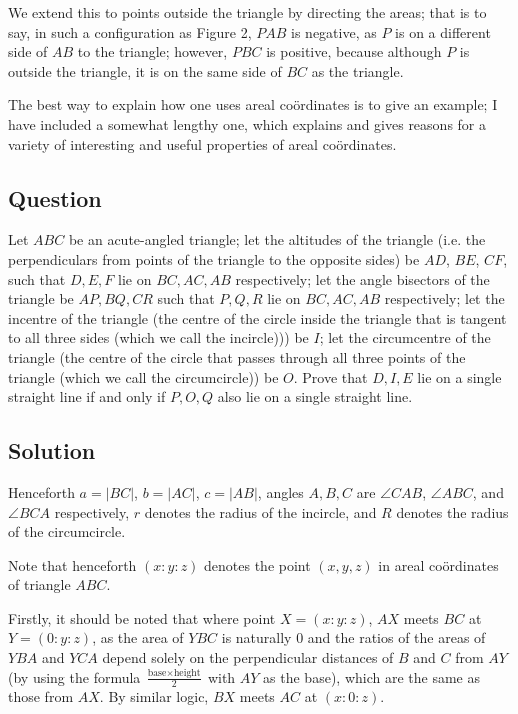 We extend this to points outside the triangle by directing the areas; that is to say, in such a configuration as Figure 2, \(PAB\) is negative, as \(P\) is on a different side of \(AB\) to the triangle; however, \(PBC\) is positive, because although \(P\) is outside the triangle, it is on the same side of \(BC\) as the triangle.

The best way to explain how one uses areal coördinates is to give an example; I have included a somewhat lengthy one, which explains and gives reasons for a variety of interesting and useful properties of areal coördinates.

\subsection{Question}

Let \(ABC\) be an acute-angled triangle; let the altitudes of the triangle (i.e. the perpendiculars from points of the triangle to the opposite sides) be \(AD\), \(BE\), \(CF\), such that \(D, E, F\) lie on \(BC, AC, AB\) respectively; let the angle bisectors of the triangle be \(AP, BQ, CR\) such that \(P, Q, R\) lie on \(BC, AC, AB\) respectively; let the incentre of the triangle (the centre of the circle inside the triangle that is tangent to all three sides (which we call the incircle))) be \(I\); let the circumcentre of the triangle (the centre of the circle that passes through all three points of the triangle (which we call the circumcircle)) be \(O\). Prove that \(D, I, E\) lie on a single straight line if and only if \(P, O, Q\) also lie on a single straight line.

\subsection{Solution}

Henceforth \(a=|BC|\), \(b=|AC|\), \(c=|AB|\), angles \(A,B,C\) are \(\angle{}CAB\), \(\angle{}ABC\), and \(\angle{}BCA\) respectively, \(r\) denotes the radius of the incircle, and \(R\) denotes the radius of the circumcircle.

Note that henceforth \((x:y:z)\) denotes the point \((x,y,z)\) in areal coördinates of triangle \(ABC\).

Firstly, it should be noted that where point \(X=(x:y:z)\), \(AX\) meets \(BC\) at \(Y=(0:y:z)\), as the area of \(YBC\) is naturally 0 and the ratios of the areas of \(YBA\) and \(YCA\) depend solely on the perpendicular distances of \(B\) and \(C\) from \(AY\) (by using the formula \(\frac{\textrm{base}\times{}\textrm{height}}{2}\) with \(AY\) as the base), which are the same as those from \(AX\). By similar logic, \(BX\) meets \(AC\) at \((x:0:z)\).

